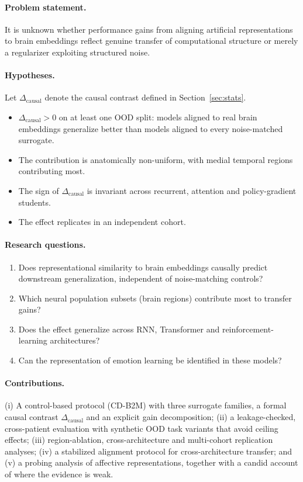\documentclass[conference]{IEEEtran}
\newcommand{\dcausal}{\Delta_{\mathrm{causal}}}
\begin{document}
\paragraph{Problem statement.}
It is unknown whether performance gains from aligning artificial representations to brain
embeddings reflect genuine transfer of computational structure or merely a regularizer exploiting structured noise.

\paragraph{Hypotheses.}
Let $\dcausal$ denote the causal contrast defined in Section~\ref{sec:stats}.
\begin{itemize}
  \item[\textbf{H1}] $\dcausal>0$ on at least one OOD split: models aligned to real brain embeddings generalize better than models aligned to every noise-matched surrogate.
  \item[\textbf{H2}] The contribution is anatomically non-uniform, with medial temporal regions contributing most.
  \item[\textbf{H3}] The sign of $\dcausal$ is invariant across recurrent, attention and policy-gradient students.
  \item[\textbf{H4}] The effect replicates in an independent cohort.
\end{itemize}

\paragraph{Research questions.}
\begin{enumerate}
  \item[\textbf{RQ1}] Does representational similarity to brain embeddings causally predict
        downstream generalization, independent of noise-matching controls?
  \item[\textbf{RQ2}] Which neural population subsets (brain regions) contribute most to transfer gains?
  \item[\textbf{RQ3}] Does the effect generalize across RNN, Transformer and reinforcement-learning architectures?
  \item[\textbf{RQ4}] Can the representation of emotion learning be identified in these models?
\end{enumerate}

\paragraph{Contributions.}
(i) A control-based protocol (CD-B2M) with three surrogate families, a formal causal contrast $\dcausal$ and an explicit gain decomposition;
(ii) a leakage-checked, cross-patient evaluation with synthetic OOD task variants that avoid ceiling effects;
(iii) region-ablation, cross-architecture and multi-cohort replication analyses;
(iv) a stabilized alignment protocol for cross-architecture transfer; and
(v) a probing analysis of affective representations, together with a candid account of where the evidence is weak.
\end{document}
